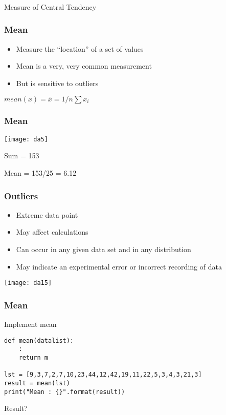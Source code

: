 \begin{frame}[fragile]\frametitle{}
\begin{center}
{\Large Measure of Central Tendency}
\end{center}
\end{frame}

\begin{frame}[fragile]\frametitle{Mean}	
\begin{itemize}
\item Measure the ``location'' of a set of values
\item Mean is a very, very common measurement
\item But is sensitive to outliers
\end{itemize}
$mean(x) = \bar{x} = 1/n \sum x_i$
\end{frame}

\begin{frame}[fragile]\frametitle{Mean}	
\begin{center}
\texttt{[image: da5]}
\end{center}
Sum = 153

Mean = 153/25 = 6.12
\end{frame}

\begin{frame}[fragile]\frametitle{Outliers}	
\begin{itemize}
\item Extreme data point
\item May affect calculations
\item  Can occur in any given data set and in any distribution
\item  May indicate an experimental error or incorrect recording of data
\end{itemize}
\begin{center}
\texttt{[image: da15]}
\end{center}
\end{frame}


\begin{frame}[fragile]\frametitle{Mean}
Implement mean
\begin{lstlisting}
def mean(datalist):
	:
	return m

lst = [9,3,7,2,7,10,23,44,12,42,19,11,22,5,3,4,3,21,3]
result = mean(lst)
print("Mean : {}".format(result))
\end{lstlisting}
Result?
\end{frame}

